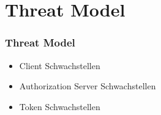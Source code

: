 \documentclass{beamer}
\begin{document}
\section{Threat Model}

\begin{frame}
\frametitle{Threat Model}
\begin{itemize}
\item Client Schwachstellen
\item Authorization Server Schwachstellen
\item Token Schwachstellen
\end{itemize}
\end{frame}



\end{document}
